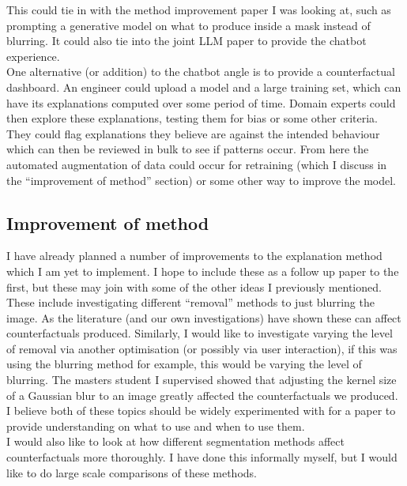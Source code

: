 This could tie in with the method improvement paper I was looking at, such as prompting a generative model on what to produce inside a mask instead of blurring. It could also tie into the joint LLM paper to provide the chatbot experience. \\

One alternative (or addition) to the chatbot angle is to provide a counterfactual dashboard. An engineer could upload a model and a large training set, which can have its explanations computed over some period of time. Domain experts could then explore these explanations, testing them for bias or some other criteria. They could flag explanations they believe are against the intended behaviour which can then be reviewed in bulk to see if patterns occur. From here the automated augmentation of data could occur for retraining (which I discuss in the “improvement of method” section) or some other way to improve the model. \\

\subsection{Improvement of method}

I have already planned a number of improvements to the explanation method which I am yet to implement. I hope to include these as a follow up paper to the first, but these may join with some of the other ideas I previously mentioned. \\

These include investigating different “removal” methods to just blurring the image. As the literature (and our own investigations) have shown these can affect counterfactuals produced. Similarly, I would like to investigate varying the level of removal via another optimisation (or possibly via user interaction), if this was using the blurring method for example, this would be varying the level of blurring. The masters student I supervised showed that adjusting the kernel size of a Gaussian blur to an image greatly affected the counterfactuals we produced. I believe both of these topics should be widely experimented with for a paper to provide understanding on what to use and when to use them. \\

I would also like to look at how different segmentation methods affect counterfactuals more thoroughly. I have done this informally myself, but I would like to do large scale comparisons of these methods. \\

